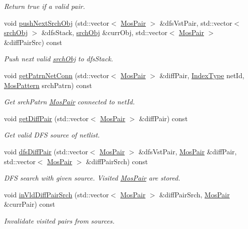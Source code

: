 \begin{DoxyCompactItemize}
\begin{DoxyCompactList}\small\item\em Return true if a valid pair. \end{DoxyCompactList}\item 
void \hyperlink{classSymDetect_a9bdb845d015762b59f3dc977a76aed32}{push\+Next\+Srch\+Obj} (std\+::vector$<$ \hyperlink{structMosPair}{Mos\+Pair} $>$ \&dfs\+Vst\+Pair, std\+::vector$<$ \hyperlink{structSymDetect_1_1srchObj}{srch\+Obj} $>$ \&dfs\+Stack, \hyperlink{structSymDetect_1_1srchObj}{srch\+Obj} \&curr\+Obj, std\+::vector$<$ \hyperlink{structMosPair}{Mos\+Pair} $>$ \&diff\+Pair\+Src) const
\begin{DoxyCompactList}\small\item\em Push next valid \hyperlink{structSymDetect_1_1srchObj}{srch\+Obj} to dfs\+Stack. \end{DoxyCompactList}\item 
void \hyperlink{classSymDetect_af7d1b22086aa98a27b1eafc9266596d8}{get\+Patrn\+Net\+Conn} (std\+::vector$<$ \hyperlink{structMosPair}{Mos\+Pair} $>$ \&diff\+Pair, \hyperlink{type_8h_a581e8093e28e7362f2b6937296190676}{Index\+Type} net\+Id, \hyperlink{type_8h_af19eddb079bfea723256710b029c38e8}{Mos\+Pattern} srch\+Patrn) const
\begin{DoxyCompactList}\small\item\em Get srch\+Patrn \hyperlink{structMosPair}{Mos\+Pair} connected to net\+Id. \end{DoxyCompactList}\item 
void \hyperlink{classSymDetect_af04b93dac7e090cef8e741d8d1812485}{get\+Diff\+Pair} (std\+::vector$<$ \hyperlink{structMosPair}{Mos\+Pair} $>$ \&diff\+Pair) const
\begin{DoxyCompactList}\small\item\em Get valid D\+FS source of netlist. \end{DoxyCompactList}\item 
void \hyperlink{classSymDetect_acd33a2c834493240fc4e8840819d676c}{dfs\+Diff\+Pair} (std\+::vector$<$ \hyperlink{structMosPair}{Mos\+Pair} $>$ \&dfs\+Vst\+Pair, \hyperlink{structMosPair}{Mos\+Pair} \&diff\+Pair, std\+::vector$<$ \hyperlink{structMosPair}{Mos\+Pair} $>$ \&diff\+Pair\+Srch) const
\begin{DoxyCompactList}\small\item\em D\+FS search with given source. Visited \hyperlink{structMosPair}{Mos\+Pair} are stored. \end{DoxyCompactList}\item 
void \hyperlink{classSymDetect_ae6a1ba27f6768f215cba0623b6e2ce08}{in\+Vld\+Diff\+Pair\+Srch} (std\+::vector$<$ \hyperlink{structMosPair}{Mos\+Pair} $>$ \&diff\+Pair\+Srch, \hyperlink{structMosPair}{Mos\+Pair} \&curr\+Pair) const
\begin{DoxyCompactList}\small\item\em Invalidate visited pairs from sources. \end{DoxyCompactList}\end{DoxyCompactItemize}
